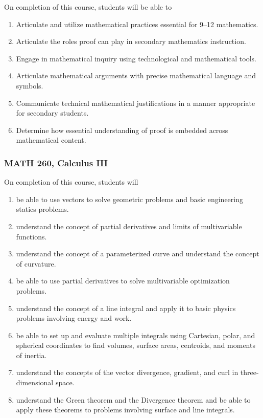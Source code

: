 \documentclass[11pt]{article}
\newenvironment{alphalist}{
\begin{enumerate}[label=(\arabic*),widest=107 ,leftmargin=25pt, itemsep=0pt]}
{\end{enumerate}}
\begin{document}
On completion of this course, students will be able to
\begin{alphalist}
\item Articulate and utilize mathematical practices essential for 9--12 mathematics.  
\item Articulate the roles proof can play in secondary mathematics instruction.
\item Engage in mathematical inquiry using technological and mathematical tools.
\item Articulate mathematical arguments with precise mathematical language and symbols.
\item Communicate technical mathematical justifications in a manner appropriate for secondary students.
\item Determine how essential understanding of proof is embedded across mathematical content.
\end{alphalist}

\subsubsection{MATH 260, Calculus III}


On completion of this course, students will 
\begin{alphalist} 
    \item be able to use vectors to solve geometric problems and basic engineering statics problems.
    \item understand the concept of partial derivatives and limits of multivariable functions.
    \item understand the concept of a parameterized curve and understand the concept of curvature.
    \item be able to use partial derivatives to solve multivariable optimization problems.
    \item understand the concept of a line integral and apply it to basic physics problems involving energy and work.
    \item be able to set up and evaluate multiple integrals using Cartesian, polar, and spherical coordinates to find volumes, 
    surface areas, centroids, and moments of inertia.
    \item understand the concepts of the vector divergence, gradient, and curl in 
    three-dimensional space.
    \item understand the Green theorem and the Divergence theorem and be able to 
    apply these theorems to problems involving surface and line integrals.
\end{alphalist}
\end{document}

